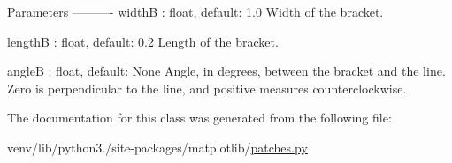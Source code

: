 \begin{DoxyVerb}Parameters
----------
widthB : float, default: 1.0
    Width of the bracket.

lengthB : float, default: 0.2
    Length of the bracket.

angleB : float, default: None
    Angle, in degrees, between the bracket and the line. Zero is
    perpendicular to the line, and positive measures
    counterclockwise.
\end{DoxyVerb}
 

The documentation for this class was generated from the following file\+:\begin{DoxyCompactItemize}
\item 
venv/lib/python3./site-\/packages/matplotlib/\hyperlink{patches_8py}{patches.\+py}\end{DoxyCompactItemize}

